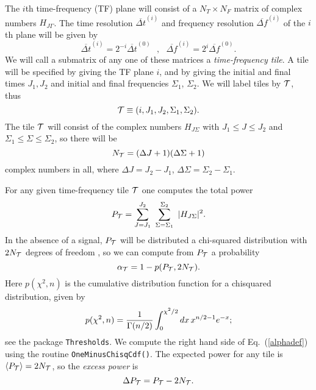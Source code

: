 The $i$th time-frequency (TF) plane will consist of a $N_T \times N_F$ matrix
of complex numbers $H_{J\Gamma}$.  The time resolution ${\overline {\Delta
t}}^{(i)}$ and frequency resolution ${\overline {\Delta f}}^{(i)}$ of the
$i$th plane will be given by
\begin{equation}
  {\overline {\Delta t}}^{(i)} = 2^{-i} {\overline {\Delta t}}^{(0)} \ \
  \ , \ \ \ 
  {\overline {\Delta f}}^{(i)} = 2^{i} {\overline {\Delta f}}^{(0)}.
  \label{resolutions}
\end{equation}
We will call a submatrix of any one of these matrices a {\it time-frequency
tile}.  A tile will be specified by giving the TF plane $i$, and by giving
the initial and final times $J_1, J_2$ and initial and final frequencies
$\Sigma_1$, $\Sigma_2$.  We will label tiles by ${\cal T}$, thus 
\begin{equation}
  {\cal T} \equiv (i,J_1,J_2,\Sigma_1,\Sigma_2).
\end{equation}
The tile ${\cal T}$ will consist
of the complex numbers $H_{J\Sigma}$ with $J_1 \le J \le J_2$ and
$\Sigma_1 \le \Sigma \le \Sigma_2$, so there will be 
\begin{equation}
  N_{\cal T} = (\Delta J+1) (\Delta \Sigma+1)
\end{equation}
complex numbers in all, where $\Delta J = J_2 - J_1$, $\Delta \Sigma =
\Sigma_2 - \Sigma_1$. 


For any given time-frequency tile ${\cal T}$ one computes the total power
\begin{equation}
  P_{\cal T} = \sum_{J = J_1}^{J_2} \ \sum_{\Sigma=\Sigma_1}^{\Sigma_2}
  \ | H_{J\Sigma} |^2.
  \label{power}
\end{equation}
In the absence of a signal, $P_{\cal T}$ will be distributed a chi-squared
distribution with $2 N_{\cal T}$ degrees of freedom \cite{abcf:2000}, so we
can compute from $P_{\cal T}$ a probability
\begin{equation}
  \alpha_{\cal T} = 1 - p(P_{\cal T},2 N_{\cal T}).
  \label{alphadef}
\end{equation}
Here $p(\chi^2,n)$ is the cumulative distribution function for a chisquared
distribution, given by
\begin{equation}
  p(\chi^2,n) = {1 \over \Gamma(n/2)} \int_0^{\chi^2/2} dx \, x^{n/2-1} e^{-x};
\end{equation}
see the package \verb+Thresholds+.  We compute the right hand side of Eq.\
(\ref{alphadef}) using the routine \verb+OneMinusChisqCdf()+.  The expected
power for any tile is $\langle P_{\cal T} \rangle = 2 N_{\cal T}$, so the {\it
excess power} is
\begin{equation}
  \Delta P_{\cal T} = P_{\cal T} - 2 N_{\cal T}.
  \label{ep}
\end{equation}


